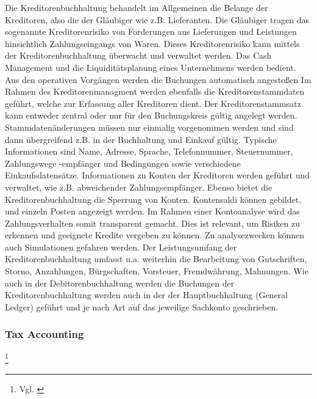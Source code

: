 Die Kreditorenbuchhaltung behandelt im Allgemeinen die Belange der Kreditoren, also die der Gläubiger wie z.B. Lieferanten. Die Gläubiger tragen das sogenannte Kreditorenrisiko von Forderungen aus Lieferungen und Leistungen hinsichtlich Zahlungseingangs von Waren. Dieses Kreditorenrisiko kann mittels der Kreditorenbuchhaltung überwacht und verwaltet werden. Das Cash Management und die Liquiditätsplanung eines Unternehmens werden bedient. \glqq Aus den operativen Vorgängen werden die Buchungen automatisch angestoßen\grqq
Im Rahmen des Kreditorenmanagment werden ebenfalls die Kreditorenstammdaten geführt, welche zur Erfassung aller Kreditoren dient. Der Kreditorenstammsatz kann entweder zentral oder nur für den Buchungskreis gültig angelegt werden. Stammdatenänderungen müssen nur einmalig vorgenommen werden und sind dann übergreifend z.B. in der Buchhaltung und Einkauf gültig. Typische Informationen sind Name, Adresse, Sprache, Telefonnummer, Steuernummer, Zahlungswege -empfänger und Bedingungen sowie verschiedene Einkaufsdatensätze. 
Informationen zu Konten der Kreditoren werden geführt und verwaltet, wie z.B. abweichender Zahlungsempfänger. Ebenso bietet die Kreditorenbuchhaltung die Sperrung von Konten. Kontensaldi können gebildet, und einzeln Posten angezeigt werden. Im Rahmen einer Kontoanalyse wird das Zahlungsverhalten somit transparent gemacht. Dies ist relevant, um Risiken zu erkennen und geeignete Kredite vergeben zu können. Zu analysezwecken können auch Simulationen gefahren werden. Der Leistungsumfang der Kreditorenbuchhaltung umfasst u.a. weiterhin die Bearbeitung von Gutschriften, Storno, Anzahlungen, Bürgschaften, Vorsteuer, Fremdwährung, Mahnungen.
Wie auch in der Debitorenbuchhaltung werden die Buchungen der Kreditorenbuchhaltung werden auch in der der Hauptbuchhaltung (General Ledger) geführt und je nach Art auf das jeweilige Sachkonto geschrieben.



\subsubsection{Tax Accounting} %
\footnote{Vgl. \cite{SAPFIAPAR2006}} %

